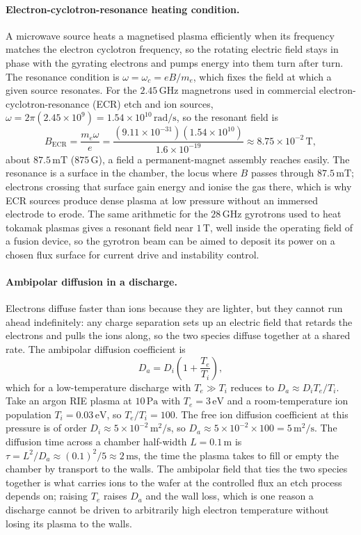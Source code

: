 \paragraph{Electron-cyclotron-resonance heating condition.}
A microwave source heats a magnetised plasma efficiently when its
frequency matches the electron cyclotron frequency, so the rotating
electric field stays in phase with the gyrating electrons and pumps energy
into them turn after turn. The resonance condition is $\omega = \omega_c =
eB/m_e$, which fixes the field at which a given source resonates. For the
$2.45\,\si{\giga\hertz}$ magnetrons used in commercial
electron-cyclotron-resonance (ECR) etch and ion sources, $\omega = 2\pi
(2.45\times 10^{9}) = 1.54\times 10^{10}\,\si{\radian\per\second}$, so the
resonant field is
\[
B_{\mathrm{ECR}} = \frac{m_e\omega}{e}
= \frac{(9.11\times 10^{-31})(1.54\times 10^{10})}{1.6\times 10^{-19}}
\approx 8.75\times 10^{-2}\,\si{\tesla},
\]
about $87.5\,\si{\milli\tesla}$ ($875\,\text{G}$), a field a
permanent-magnet assembly reaches
easily. The resonance is a surface in the chamber, the locus where $B$
passes through $87.5\,\si{\milli\tesla}$; electrons crossing that surface
gain energy and ionise the gas there, which is why ECR sources produce
dense plasma at low pressure without an immersed electrode to erode. The
same arithmetic for the $28\,\si{\giga\hertz}$ gyrotrons used to heat
tokamak plasmas gives a resonant field near $1\,\si{\tesla}$, well inside
the operating field of a fusion device, so the gyrotron beam can be aimed
to deposit its power on a chosen flux surface for current drive and
instability control.

\paragraph{Ambipolar diffusion in a discharge.}
Electrons diffuse faster than ions because they are lighter, but they
cannot run ahead indefinitely: any charge separation sets up an electric
field that retards the electrons and pulls the ions along, so the two
species diffuse together at a shared  rate. The
ambipolar diffusion coefficient is
\[
D_a = D_i\!\left(1 + \frac{T_e}{T_i}\right),
\]
which for a low-temperature discharge with $T_e \gg T_i$ reduces to $D_a
\approx D_i T_e/T_i$. Take an argon RIE plasma at $10\,\si{\pascal}$ with
$T_e = 3\,\si{\electronvolt}$ and a room-temperature ion population $T_i =
0.03\,\si{\electronvolt}$, so $T_e/T_i = 100$. The free ion diffusion
coefficient at this pressure is of order $D_i \approx 5\times
10^{-2}\,\si{\meter\squared\per\second}$, so $D_a \approx 5\times 10^{-2}
\times 100 = 5\,\si{\meter\squared\per\second}$. The diffusion time across a
chamber half-width $L = 0.1\,\si{\meter}$ is $\tau = L^{2}/D_a \approx
(0.1)^{2}/5 \approx 2\,\si{\milli\second}$, the time the plasma takes to
fill or empty the chamber by transport to the walls. The ambipolar field
that ties the two species together is what carries ions to the wafer at the
controlled flux an etch process depends on; raising $T_e$ raises $D_a$ and
the wall loss, which is one reason a discharge cannot be driven to
arbitrarily high electron temperature without losing its plasma to the
walls.

